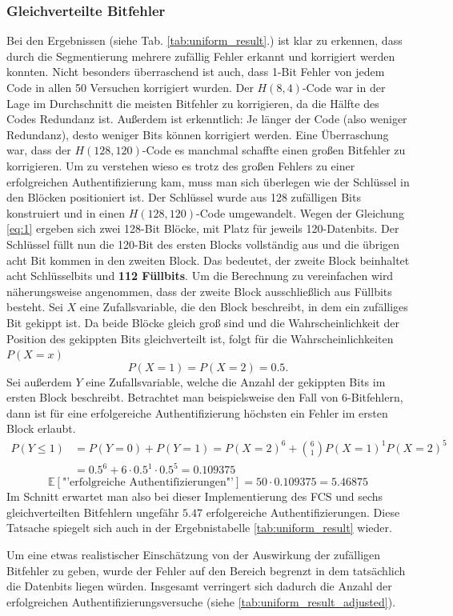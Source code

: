 \documentclass{article}
\begin{document}
    \subsubsection{Gleichverteilte Bitfehler}
    Bei den Ergebnissen (siehe Tab. \ref{tab:uniform_result}.) ist klar zu erkennen, dass durch die Segmentierung 
    mehrere zufällig Fehler erkannt und korrigiert werden konnten.
    Nicht besonders überraschend ist auch, dass 1-Bit Fehler von jedem Code in allen 50 Versuchen korrigiert 
    wurden. Der $H(8,4)$-Code war in der Lage im Durchschnitt die meisten Bitfehler zu korrigieren, da die
    Hälfte des Codes Redundanz ist. Außerdem ist erkenntlich: Je länger der Code (also weniger Redundanz), desto
    weniger Bits können korrigiert werden. Eine Überraschung war, dass der $H(128,120)$-Code es manchmal schaffte
    einen großen Bitfehler zu korrigieren. Um zu verstehen wieso es trotz des großen Fehlers zu einer erfolgreichen
    Authentifizierung kam, muss man sich überlegen wie der Schlüssel in den Blöcken positioniert ist.\newline
    Der Schlüssel wurde aus 128 zufälligen Bits konstruiert und in einen $H(128,120)$-Code umgewandelt.
    Wegen der Gleichung \ref{eq:1} ergeben sich zwei 128-Bit Blöcke, mit Platz für jeweils 120-Datenbits.
    Der Schlüssel füllt nun die 120-Bit des ersten Blocks vollständig aus und die übrigen acht Bit kommen
    in den zweiten Block. Das bedeutet, der zweite Block beinhaltet acht Schlüsselbits und \textbf{112 Füllbits}.
    Um die Berechnung zu vereinfachen wird näherungsweise angenommen, dass der zweite Block ausschließlich aus
    Füllbits besteht. Sei $X$ eine Zufallsvariable, die den Block beschreibt, in dem ein zufälliges Bit 
    gekippt ist. Da beide Blöcke gleich groß sind und die Wahrscheinlichkeit der Position des gekippten Bits
    gleichverteilt ist, folgt für die Wahrscheinlichkeiten $P(X=x)$
    \[
        P(X=1) = P(X=2) = 0.5.
    \]
    Sei außerdem $Y$ eine Zufallsvariable, welche die Anzahl der gekippten Bits im ersten Block beschreibt.
    Betrachtet man beispielsweise den Fall von 6-Bitfehlern, dann ist für eine erfolgereiche Authentifizierung
    höchsten ein Fehler im ersten Block erlaubt.
    \begin{align*}
        P(Y \leq 1) &= P(Y = 0) + P(Y = 1) = P(X=2)^{6} + {6\choose 1}P(X=1)^1P(X=2)^{5}\\
        &=0.5^{6} + 6\cdot 0.5^1 \cdot 0.5^5 = 0.109375
    \end{align*}
    \[
        \mathbb{E}\left[\text{"'erfolgreiche Authentifizierungen"'}\right] =  50 \cdot 0.109375 = 5.46875
    \]
    Im Schnitt erwartet man also bei dieser Implementierung des FCS und sechs gleichverteilten Bitfehlern 
    ungefähr $5.47$ erfolgereiche Authentifizierungen. Diese Tatsache spiegelt sich auch in der Ergebnistabelle 
    \ref{tab:uniform_result} wieder.
    
    Um eine etwas realistischer Einschätzung von der Auswirkung der zufälligen Bitfehler zu geben, wurde der Fehler
    auf den Bereich begrenzt in dem tatsächlich die Datenbits liegen würden. Insgesamt verringert sich dadurch die Anzahl der
    erfolgreichen Authentifizierungsversuche (siehe \ref{tab:uniform_result_adjusted}).
    
\end{document}
